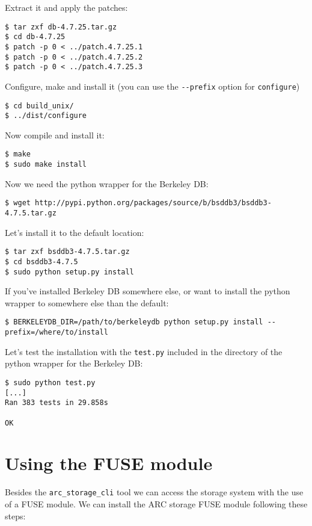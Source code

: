 \documentclass{book}
\begin{document}
Extract it and apply the patches:
\begin{verbatim}
$ tar zxf db-4.7.25.tar.gz
$ cd db-4.7.25
$ patch -p 0 < ../patch.4.7.25.1
$ patch -p 0 < ../patch.4.7.25.2
$ patch -p 0 < ../patch.4.7.25.3
\end{verbatim}

Configure, make and install it (you can use the \verb!--prefix! option for \verb!configure!)
\begin{verbatim}
$ cd build_unix/
$ ../dist/configure
\end{verbatim}

Now compile and install it:
\begin{verbatim}
$ make
$ sudo make install
\end{verbatim}

Now we need the python wrapper for the Berkeley DB:

\begin{verbatim}
$ wget http://pypi.python.org/packages/source/b/bsddb3/bsddb3-4.7.5.tar.gz
\end{verbatim}

Let's install it to the default location:

\begin{verbatim}
$ tar zxf bsddb3-4.7.5.tar.gz
$ cd bsddb3-4.7.5
$ sudo python setup.py install
\end{verbatim}

If you've installed Berkeley DB somewhere else, or want to install the python wrapper to somewhere else than the default:

\begin{verbatim}
$ BERKELEYDB_DIR=/path/to/berkeleydb python setup.py install --prefix=/where/to/install
\end{verbatim}

Let's test the installation with the \verb!test.py! included in the directory of the python wrapper for the Berkeley DB:
\begin{verbatim}
$ sudo python test.py
[...]
Ran 383 tests in 29.858s

OK
\end{verbatim}



\section{Using the FUSE module} %
\label{sec:using_the_fuse_module}

Besides the \verb!arc_storage_cli! tool we can access the storage system with the use of a FUSE module. We can install the ARC storage FUSE module following these steps:
\end{document}
